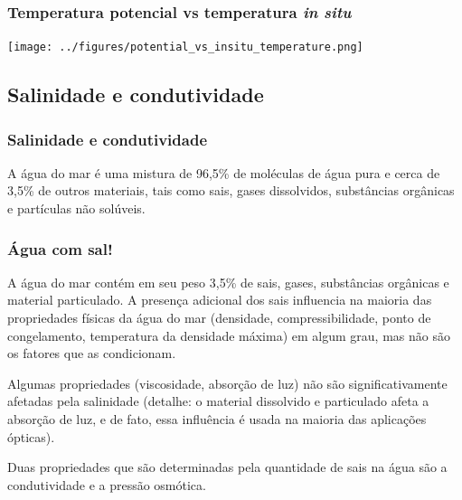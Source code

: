 \begin{frame}
\frametitle{Temperatura potencial vs temperatura {\it in situ}}
    \begin{center}
        \texttt{[image: ../figures/potential\_vs\_insitu\_temperature.png]}
    \end{center}
\end{frame}

\subsection{Salinidade e condutividade}
\begin{frame}
\frametitle{Salinidade e condutividade}
    \begin{block}{}
        A água do mar é uma mistura de 96,5\% de moléculas de água pura e cerca
        de 3,5\% de outros materiais, tais como sais, gases dissolvidos,
        substâncias orgânicas e partículas não solúveis.
    \end{block}
\end{frame}

\begin{frame}
\frametitle{Água com sal!}
    \small{
    \begin{block}{}
        A água do mar contém em seu peso 3,5\% de sais, gases, substâncias
        orgânicas e material particulado.  A presença adicional dos sais
        influencia na maioria das propriedades físicas da água do mar
        (densidade, compressibilidade, ponto de congelamento, temperatura da
        densidade máxima) em algum grau, mas não são os fatores que as
        condicionam.
    \end{block}

    \pause
    \begin{block}{}
        Algumas propriedades (viscosidade, absorção de luz) não são
        significativamente afetadas pela salinidade (detalhe: o material
        dissolvido e particulado afeta a absorção de luz, e de fato, essa
        influência é usada na maioria das aplicações ópticas).

        Duas propriedades que são determinadas pela quantidade de sais na água
        são a condutividade e a pressão osmótica.
    \end{block}
    }
\end{frame}


